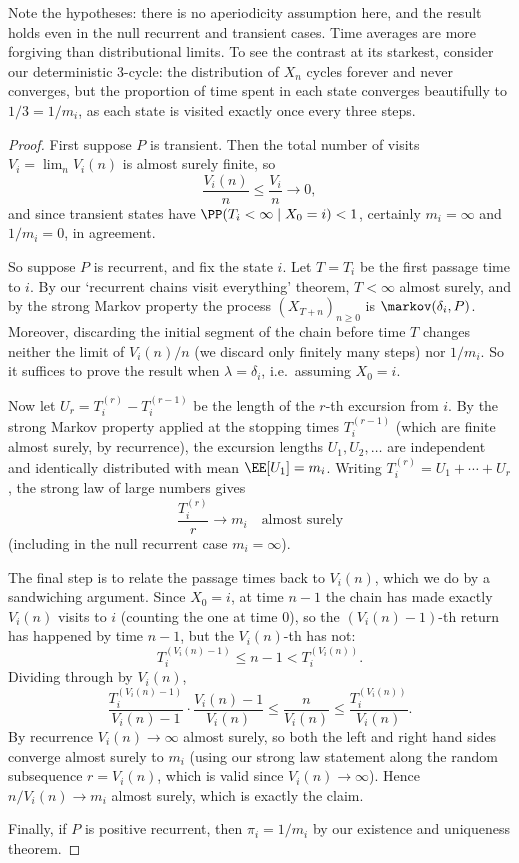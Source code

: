 \documentclass[a4paper]{scrartcl}
\begin{document}
Note the hypotheses: there is no aperiodicity assumption here, and the result holds even in the null recurrent and transient cases. Time averages are more forgiving than distributional limits. To see the contrast at its starkest, consider our deterministic 3-cycle: the distribution of $X_n$ cycles forever and never converges, but the proportion of time spent in each state converges beautifully to $1/3 = 1/m_i$, as each state is visited exactly once every three steps.

\begin{proof}
	First suppose $P$ is transient. Then the total number of visits $V_i = \lim_n V_i(n)$ is almost surely finite, so
	$$
	\frac{V_i(n)}{n} \leq \frac{V_i}{n} \rightarrow 0,
	$$
	and since transient states have $\PP(T_i < \infty \mid X_0 = i) < 1$, certainly $m_i = \infty$ and $1/m_i = 0$, in agreement.

	So suppose $P$ is recurrent, and fix the state $i$. Let $T = T_i$ be the first passage time to $i$. By our `recurrent chains visit everything' theorem, $T < \infty$ almost surely, and by the strong Markov property the process $(X_{T + n})_{n \geq 0}$ is $\markov(\delta_i, P)$. Moreover, discarding the initial segment of the chain before time $T$ changes neither the limit of $V_i(n)/n$ (we discard only finitely many steps) nor $1/m_i$. So it suffices to prove the result when $\lambda = \delta_i$, i.e.\ assuming $X_0 = i$.

	Now let $U_r = T_i^{(r)} - T_i^{(r - 1)}$ be the length of the $r$-th excursion from $i$. By the strong Markov property applied at the stopping times $T_i^{(r - 1)}$ (which are finite almost surely, by recurrence), the excursion lengths $U_1, U_2, \dots$ are independent and identically distributed with mean $\EE[U_1] = m_i$. Writing $T_i^{(r)} = U_1 + \cdots + U_r$, the strong law of large numbers gives
	$$
	\frac{T_i^{(r)}}{r} \rightarrow m_i \quad \text{almost surely}
	$$
	(including in the null recurrent case $m_i = \infty$).

	The final step is to relate the passage times back to $V_i(n)$, which we do by a sandwiching argument. Since $X_0 = i$, at time $n - 1$ the chain has made exactly $V_i(n)$ visits to $i$ (counting the one at time 0), so the $(V_i(n) - 1)$-th return has happened by time $n - 1$, but the $V_i(n)$-th has not:
	$$
	T_i^{(V_i(n) - 1)} \leq n - 1 < T_i^{(V_i(n))}.
	$$
	Dividing through by $V_i(n)$,
	$$
	\frac{T_i^{(V_i(n) - 1)}}{V_i(n) - 1} \cdot \frac{V_i(n) - 1}{V_i(n)} \leq \frac{n}{V_i(n)} \leq \frac{T_i^{(V_i(n))}}{V_i(n)}.
	$$
	By recurrence $V_i(n) \rightarrow \infty$ almost surely, so both the left and right hand sides converge almost surely to $m_i$ (using our strong law statement along the random subsequence $r = V_i(n)$, which is valid since $V_i(n) \rightarrow \infty$). Hence $n / V_i(n) \rightarrow m_i$ almost surely, which is exactly the claim.

	Finally, if $P$ is positive recurrent, then $\pi_i = 1/m_i$ by our existence and uniqueness theorem.
\end{proof}
\end{document}
